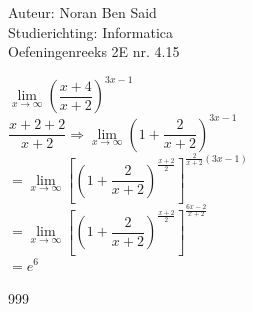 \documentclass[a4paper]{article}
\begin{document}
\noindent \large Auteur: Noran Ben Said\\
\noindent \large Studierichting: Informatica\\
\noindent \large Oefeningenreeks 2E nr. 4.15 \\

\medskip
\normalsize

$ \lim\limits_{x \to \infty}\left(\dfrac{x+4}{x+2}\right)^{3x-1}$\\

$\dfrac{x+2+2}{x+2} \Rightarrow \lim\limits_{x \to \infty}\left(1+\dfrac{2}{x+2}\right)^{3x-1}$\\

$ = \lim\limits_{x \to \infty}
\left[\left(1+\dfrac{2}{x+2}\right)^{\tfrac{x+2}{2}}\right]^{\tfrac{2}{x+2}(3x-1)}$\\

$ = \lim\limits_{x \to \infty}
\left[\left(1+\dfrac{2}{x+2}\right)^{\tfrac{x+2}{2}}\right]^{\tfrac{6x-2}{x+2}}$\\

$ = e^6$\\


\begin{thebibliography}{999}
\end{thebibliography}
\end{document}
